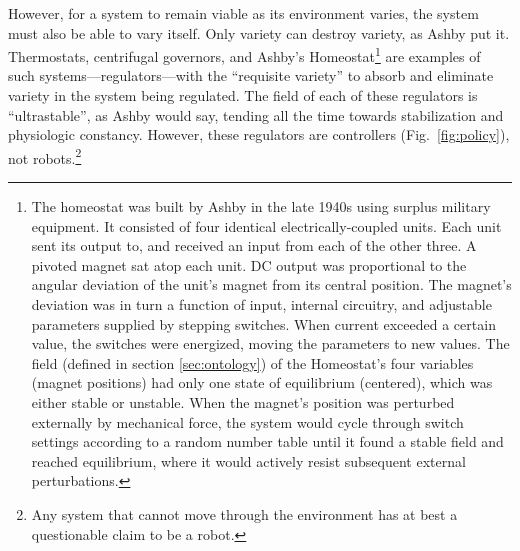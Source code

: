However, for a system to remain viable as its environment varies, the system must also be able to vary itself.
Only variety can destroy variety, as Ashby put it.
Thermostats, centrifugal governors, and Ashby's Homeostat\footnote{%
The homeostat was built by Ashby in the late 1940s using surplus military equipment.
It consisted of four identical electrically-coupled units.
Each unit sent its output to, and received an input from each of the other three.
A pivoted magnet sat atop each unit.
DC output was proportional to the angular deviation of the unit's magnet from its central position.
The magnet's deviation was in turn a function of input, internal circuitry, and 
adjustable parameters supplied by stepping switches.
When current exceeded a certain value, the switches were energized, moving the parameters to new values.
The field (defined in section \ref{sec:ontology}) of the Homeostat's four variables (magnet positions) had only one state of equilibrium (centered), which was either stable or unstable.
When the magnet's position was perturbed externally by mechanical force, the system would cycle through switch settings according to a random number table until it found a stable field and reached equilibrium, where it would actively resist subsequent external perturbations.
}
are examples of such systems---regulators---with the ``requisite variety'' to
absorb and eliminate
variety in the system being regulated.
The field of each of these regulators is ``ultrastable'', as Ashby would say, tending all the time towards stabilization and
physiologic constancy.
However, these regulators are controllers (Fig.~\ref{fig:policy}), not robots.\footnote{Any system that cannot move through the environment has at best a questionable claim to be a robot.}

